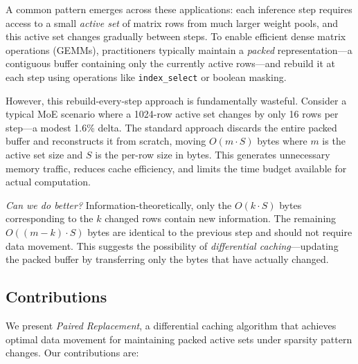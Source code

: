 \documentclass{article}
\numberwithin{equation}{section}
\theoremstyle{plain}
\theoremstyle{definition}
\theoremstyle{remark}
\begin{document}
A common pattern emerges across these applications: each inference step requires access to a small \emph{active set} of matrix rows from much larger weight pools, and this active set changes gradually between steps. To enable efficient dense matrix operations (GEMMs), practitioners typically maintain a \emph{packed} representation—a contiguous buffer containing only the currently active rows—and rebuild it at each step using operations like \texttt{index\_select} or boolean masking.

However, this rebuild-every-step approach is fundamentally wasteful. Consider a typical MoE scenario where a 1024-row active set changes by only 16 rows per step—a modest 1.6\% delta. The standard approach discards the entire packed buffer and reconstructs it from scratch, moving $O(m \cdot S)$ bytes where $m$ is the active set size and $S$ is the per-row size in bytes. This generates unnecessary memory traffic, reduces cache efficiency, and limits the time budget available for actual computation.

\emph{Can we do better?} Information-theoretically, only the $O(k \cdot S)$ bytes corresponding to the $k$ changed rows contain new information. The remaining $O((m-k) \cdot S)$ bytes are identical to the previous step and should not require data movement. This suggests the possibility of \emph{differential caching}—updating the packed buffer by transferring only the bytes that have actually changed.

\subsection{Contributions}

We present \emph{Paired Replacement}, a differential caching algorithm that achieves optimal data movement for maintaining packed active sets under sparsity pattern changes. Our contributions are:
\end{document}
